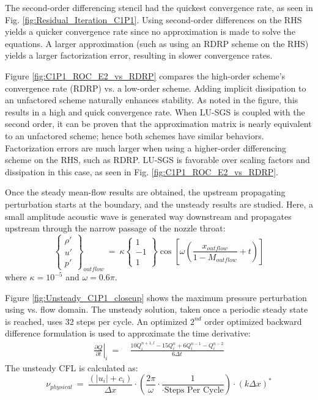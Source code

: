 \documentclass[conf]{new-aiaa}
\begin{document}
The second-order differencing stencil had the quickest convergence rate, as seen in Fig. \ref{fig:Residual_Iteration_C1P1}. 
Using second-order differences on the RHS yields a quicker convergence rate since no approximation is made to solve the equations. 
A larger approximation (such as using an RDRP scheme on the RHS) yields a larger factorization error, resulting in slower convergence rates. 

Figure \ref{fig:C1P1_ROC_E2_vs_RDRP} compares the high-order scheme's convergence rate (RDRP) vs. a low-order scheme. 
Adding implicit dissipation to an unfactored scheme naturally enhances stability. 
As noted in the figure, this results in a high and quick convergence rate. 
When LU-SGS is coupled with the second order, it can be proven that the approximation matrix is nearly equivalent to an unfactored scheme; hence both schemes have similar behaviors. 
Factorization errors are much larger when using a higher-order differencing scheme on the RHS, such as RDRP.  
LU-SGS is favorable over scaling factors and dissipation in this case, as seen in Fig. \ref{fig:C1P1_ROC_E2_vs_RDRP}.


Once the steady mean-flow results are obtained, the upstream propagating perturbation starts at the boundary, and the unsteady results are studied.  
Here, a small amplitude acoustic wave is generated way downstream and propagates upstream through the narrow passage of the nozzle throat:
\begin{equation*}
	\left\{
	\begin{matrix}
		{\rho}' \\
		{u}' \\
		{p}'
	\end{matrix}
	\right\}_{outflow}~=~
\kappa
	\left\{
	\begin{matrix}
		1 \\
		-1 \\
		1
	\end{matrix}
	\right\}\cos\left[\omega\left(\frac{x_{outflow}}{1-M_{outflow}}+t\right)\right]
\end{equation*}
where $\kappa=10^{-5}$ and $\omega=0.6\pi$. 

Figure \ref{fig:Unsteady_C1P1_closeup} shows the maximum pressure perturbation using vs. flow domain. 
The unsteady solution, taken once a periodic steady state is reached, uses 32 steps per cycle. An optimized $2^{nd}$ order optimized backward difference formulation \cite{HixonImplicit} is used to approximate the time derivative:
\begin{equation}
	\begin{split}
		\label{eq:2ndOrderdQdT}
  			\left.\frac{\partial{Q}}{\partial{t}}\right|_i~=&~\frac{10Q_i^{n+1, l}-15Q_i^n+6Q_i^{n-1}-Q_i^{n-2}}{6\Delta{t}}
	\end{split}
\end{equation}
The unsteady CFL is calculated as:
\begin{equation*}
	\nu_{physical}
  			~=~\frac{\left(\left|u_i\right|+c_i\right)}{\Delta{x}}\cdot\left(\frac{2\pi}{\omega}\cdot\frac{1}{\cdot \text{Steps~Per~Cycle}}\right)\cdot\left(k\Delta{x}\right)^*
\end{equation*}
\end{document}
